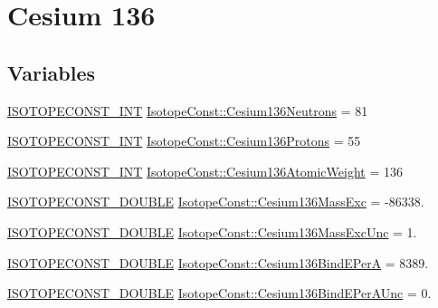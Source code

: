\hypertarget{group___isotope_const-_cesium-_cs136}{}\section{Cesium 136}
\label{group___isotope_const-_cesium-_cs136}
\subsection*{Variables}
\begin{DoxyCompactItemize}
\item 
\mbox{\hyperlink{group___isotope_const-_macros_ga5f18360b3e99483a35c32d789e62621c}{I\+S\+O\+T\+O\+P\+E\+C\+O\+N\+S\+T\+\_\+\+I\+NT}} \mbox{\hyperlink{group___isotope_const-_cesium-_cs136_ga09e96b702dbbc3a389bc5ae329ad568b}{Isotope\+Const\+::\+Cesium136\+Neutrons}} = 81
\item 
\mbox{\hyperlink{group___isotope_const-_macros_ga5f18360b3e99483a35c32d789e62621c}{I\+S\+O\+T\+O\+P\+E\+C\+O\+N\+S\+T\+\_\+\+I\+NT}} \mbox{\hyperlink{group___isotope_const-_cesium-_cs136_gacea1d12dda734f8208d827ae76bc1df0}{Isotope\+Const\+::\+Cesium136\+Protons}} = 55
\item 
\mbox{\hyperlink{group___isotope_const-_macros_ga5f18360b3e99483a35c32d789e62621c}{I\+S\+O\+T\+O\+P\+E\+C\+O\+N\+S\+T\+\_\+\+I\+NT}} \mbox{\hyperlink{group___isotope_const-_cesium-_cs136_ga4e37e5e1140f4bc7fb932ed64d631fc4}{Isotope\+Const\+::\+Cesium136\+Atomic\+Weight}} = 136
\item 
\mbox{\hyperlink{group___isotope_const-_macros_ga8f45a7272ce02c0b4c65c44636ed719a}{I\+S\+O\+T\+O\+P\+E\+C\+O\+N\+S\+T\+\_\+\+D\+O\+U\+B\+LE}} \mbox{\hyperlink{group___isotope_const-_cesium-_cs136_ga9943d05d50dad9783f789695b9b8d2ac}{Isotope\+Const\+::\+Cesium136\+Mass\+Exc}} = -\/86338.
\item 
\mbox{\hyperlink{group___isotope_const-_macros_ga8f45a7272ce02c0b4c65c44636ed719a}{I\+S\+O\+T\+O\+P\+E\+C\+O\+N\+S\+T\+\_\+\+D\+O\+U\+B\+LE}} \mbox{\hyperlink{group___isotope_const-_cesium-_cs136_ga5fe10033bb56f53ca2763a59e1e60c7d}{Isotope\+Const\+::\+Cesium136\+Mass\+Exc\+Unc}} = 1.
\item 
\mbox{\hyperlink{group___isotope_const-_macros_ga8f45a7272ce02c0b4c65c44636ed719a}{I\+S\+O\+T\+O\+P\+E\+C\+O\+N\+S\+T\+\_\+\+D\+O\+U\+B\+LE}} \mbox{\hyperlink{group___isotope_const-_cesium-_cs136_gaf2fdb915361d4111cacf90c07673dc13}{Isotope\+Const\+::\+Cesium136\+Bind\+E\+PerA}} = 8389.
\item 
\mbox{\hyperlink{group___isotope_const-_macros_ga8f45a7272ce02c0b4c65c44636ed719a}{I\+S\+O\+T\+O\+P\+E\+C\+O\+N\+S\+T\+\_\+\+D\+O\+U\+B\+LE}} \mbox{\hyperlink{group___isotope_const-_cesium-_cs136_gace0196df7b3eac62c5c08f6472bcfe4b}{Isotope\+Const\+::\+Cesium136\+Bind\+E\+Per\+A\+Unc}} = 0.

\end{DoxyCompactItemize}
